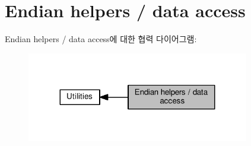 \hypertarget{group__endian}{}\section{Endian helpers / data access}
\label{group__endian}
Endian helpers / data access에 대한 협력 다이어그램\+:
\nopagebreak
\begin{figure}[H]
\begin{center}
\leavevmode
\includegraphics[width=275pt]{group__endian}
\end{center}
\end{figure}
